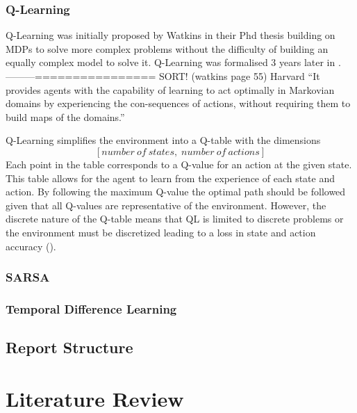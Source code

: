 \documentclass[10pt,journal]{IEEEtran}
\begin{document}
\subsubsection{Q-Learning}
Q-Learning was initially proposed by Watkins in their Phd thesis \cite{Watkins89} building on MDPs to solve more complex problems without the difficulty of building an equally complex model to solve it. Q-Learning was formalised 3 years later in \cite{Watkins}.
---------================ SORT! (watkins page 55) Harvard
“It provides  agents with the capability of learning to act optimally in Markovian domains by experiencing the con-sequences of actions, without requiring them to build maps of the domains.”

Q-Learning simplifies the environment into a Q-table with the dimensions $$[number \: of \: states, \; number \: of \: actions]$$ Each point in the table corresponds to a Q-value for an action at the given state. This table allows for the agent to learn from the experience of each state and action. By following the maximum Q-value the optimal path should be followed given that all Q-values are representative of the environment. However, the discrete nature of the Q-table means that QL is limited to discrete problems or the environment must be discretized leading to a loss in state and action accuracy (\cite{Gaskett}). 

\subsubsection{SARSA}

\subsubsection{Temporal Difference Learning}

\subsection{Report Structure}

\tableofcontents{}

\section{Literature Review}
\end{document}
